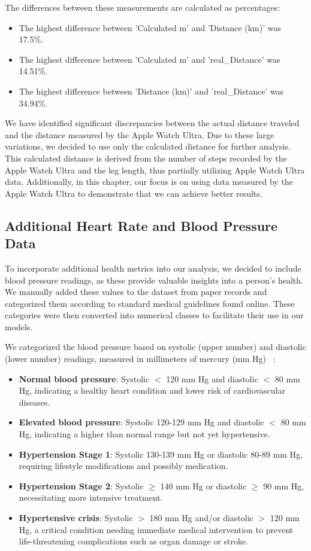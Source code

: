 The differences between these measurements are calculated as percentages:
\begin{itemize}
    \item The highest difference between 'Calculated m' and 'Distance (km)' was 17.5\%.
    \item The highest difference between 'Calculated m' and 'real\_Distance' was 14.51\%.
    \item The highest difference between 'Distance (km)' and 'real\_Distance' was 34.94\%.
\end{itemize}

We have identified significant discrepancies between the actual distance traveled and the distance measured by the Apple Watch Ultra. Due to these large variations, we decided to use only the calculated distance for further analysis. This calculated distance is derived from the number of steps recorded by the Apple Watch Ultra and the leg length, thus partially utilizing Apple Watch Ultra data. Additionally, in this chapter, our focus is on using data measured by the Apple Watch Ultra to demonstrate that we can achieve better results.

\subsection{Additional Heart Rate and Blood Pressure Data}

To incorporate additional health metrics into our analysis, we decided to include blood pressure readings, as these provide valuable insights into a person's health. We manually added these values to the dataset from paper records and categorized them according to standard medical guidelines found online. These categories were then converted into numerical classes to facilitate their use in our models.

We categorized the blood pressure based on systolic (upper number) and diastolic (lower number) readings, measured in millimeters of mercury (mm Hg) ~\cite{heartUnderstandingBlood}:
\begin{itemize}
    \item \textbf{Normal blood pressure}: Systolic $<$ 120 mm Hg and diastolic $<$ 80 mm Hg, indicating a healthy heart condition and lower risk of cardiovascular diseases.
    \item \textbf{Elevated blood pressure}: Systolic 120-129 mm Hg and diastolic $<$ 80 mm Hg, indicating a higher than normal range but not yet hypertensive.
    \item \textbf{Hypertension Stage 1}: Systolic 130-139 mm Hg or diastolic 80-89 mm Hg, requiring lifestyle modifications and possibly medication.
    \item \textbf{Hypertension Stage 2}: Systolic $\geq$ 140 mm Hg or diastolic $\geq$ 90 mm Hg, necessitating more intensive treatment.
    \item \textbf{Hypertensive crisis}: Systolic $>$ 180 mm Hg and/or diastolic $>$ 120 mm Hg, a critical condition needing immediate medical intervention to prevent life-threatening complications such as organ damage or stroke.
\end{itemize}

